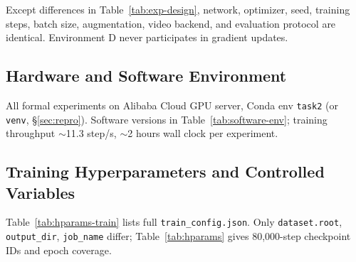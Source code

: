 \documentclass[10pt,twocolumn,letterpaper]{article}
\newcommand{\tabref}[1]{Table~\ref{#1}}
\begin{document}
Except differences in \tabref{tab:exp-design}, network, optimizer, seed, training steps, batch size, augmentation, video backend, and evaluation protocol are identical. Environment D never participates in gradient updates.

\subsection{Hardware and Software Environment}

All formal experiments on Alibaba Cloud GPU server, Conda env \texttt{task2} (or \texttt{venv}, \S\ref{sec:repro}). Software versions in \tabref{tab:software-env}; training throughput $\sim$11.3 step/s, $\sim$2 hours wall clock per experiment.

\begin{table}[H]
  \centering
  \caption{Hardware and software environment}
  \label{tab:software-env}
  \footnotesize
\end{table}

\subsection{Training Hyperparameters and Controlled Variables}

\tabref{tab:hparams-train} lists full \texttt{train\_config.json}. Only \texttt{dataset.root}, \texttt{output\_dir}, \texttt{job\_name} differ; \tabref{tab:hparams} gives 80{,}000-step checkpoint IDs and epoch coverage.
\end{document}
